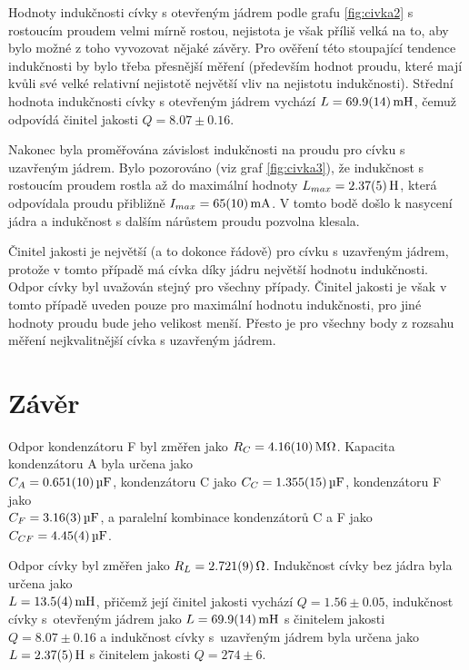 \documentclass{../concepts/prepareprotokol} %
\begin{document}
Hodnoty indukčnosti cívky s otevřeným jádrem podle grafu \ref{fig:civka2} s rostoucím proudem velmi mírně rostou, nejistota je však příliš velká na to, aby bylo možné z toho vyvozovat nějaké závěry. Pro ověření této stoupající tendence indukčnosti by bylo třeba přesnější měření (především hodnot proudu, které mají kvůli své velké relativní nejistotě největší vliv na nejistotu indukčnosti). Střední hodnota indukčnosti cívky s otevřeným jádrem vychází $L = \qty{69.9\pm1.4}{\milli\henry}$, čemuž odpovídá činitel jakosti $Q = 8.07\pm0.16$.

Nakonec byla proměřována závislost indukčnosti na proudu pro cívku s uzavřeným jádrem. Bylo pozorováno (viz graf \ref{fig:civka3}), že indukčnost s rostoucím proudem rostla až do maximální hodnoty $L_{max} = \qty{2.37\pm0.05}{\henry}$, která odpovídala proudu přibližně $I_{max}= \qty{65\pm10}{\milli\ampere}$. V tomto bodě došlo k nasycení jádra a indukčnost s dalším nárůstem proudu pozvolna klesala.

Činitel jakosti je největší (a to dokonce řádově) pro cívku s uzavřeným jádrem, protože v tomto případě má cívka díky jádru největší hodnotu indukčnosti. Odpor cívky byl uvažován stejný pro všechny případy. Činitel jakosti je však v tomto případě uveden pouze pro maximální hodnotu indukčnosti, pro jiné hodnoty proudu bude jeho velikost menší. Přesto je pro všechny body z rozsahu měření nejkvalitnější cívka s uzavřeným jádrem.

\section{Závěr}

\hspace{\parindent} Odpor kondenzátoru F byl změřen jako $R_C = \qty{4.16\pm0.10}{\mega\ohm}$.
Kapacita kondenzátoru A byla určena jako \\$C_A = \qty{0.651 \pm 0.010}{\micro\farad}$,
kondenzátoru C jako $C_C = \qty{1.355 \pm 0.015}{\micro\farad}$,
kondenzátoru F jako \\$ C_F = \qty{3.16 \pm 0.03}{\micro\farad}$,
a paralelní kombinace kondenzátorů C a F jako $C_{CF} = \qty{4.45 \pm 0.04}{\micro\farad}$.
\vspace{1mm}

Odpor cívky byl změřen jako $R_L = \qty{2.721\pm0.009}{\ohm}$.
Indukčnost cívky bez jádra byla určena jako \\$L = \qty{13.5\pm0.4}{\milli\henry}$, přičemž její činitel jakosti vychází $Q = 1.56\pm0.05$,
indukčnost cívky s~otevřeným jádrem jako $L = \qty{69.9\pm1.4}{\milli\henry}$ s činitelem jakosti $Q = 8.07\pm0.16$
a indukčnost cívky s~uzavřeným jádrem byla určena jako $L = \qty{2.37\pm0.05}{\henry}$ s činitelem jakosti $Q = 274\pm6$.
\end{document}

